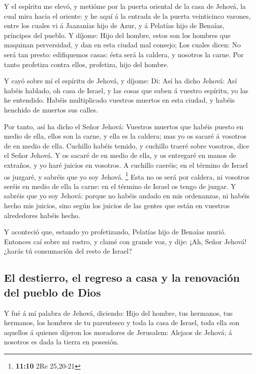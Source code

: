  Y el espíritu me elevó, y metióme por la puerta oriental de
la casa de Jehová, la cual mira hacia el oriente: y he aquí á la entrada
de la puerta veinticinco varones, entre los cuales vi á Jaazanías hijo
de Azur, y á Pelatías hijo de Benaías, príncipes del pueblo.
 Y díjome: Hijo del hombre, estos son los hombres que
maquinan perversidad, y dan en esta ciudad mal consejo;  Los
cuales dicen: No será tan presto: edifiquemos casas: ésta será la
caldera, y nosotros la carne.  Por tanto profetiza contra
ellos, profetiza, hijo del hombre.

 Y cayó sobre mí el espíritu de Jehová, y díjome: Di: Así ha
dicho Jehová: Así habéis hablado, oh casa de Israel, y las cosas que
suben á vuestro espíritu, yo las he entendido.  Habéis
multiplicado vuestros muertos en esta ciudad, y habéis henchido de
muertos sus calles.

 Por tanto, así ha dicho el Señor Jehová: Vuestros muertos
que habéis puesto en medio de ella, ellos son la carne, y ella es la
caldera; mas yo os sacaré á vosotros de en medio de ella. 
Cuchillo habéis temido, y cuchillo traeré sobre vosotros, dice el Señor
Jehová.  Y os sacaré de en medio de ella, y os entregaré en
manos de extraños, y yo haré juicios en vosotros.  A
cuchillo caeréis; en el término de Israel os juzgaré, y sabréis que yo
soy Jehová. \footnote{\textbf{11:10} 2Re 25,20-21}  Esta no
os será por caldera, ni vosotros seréis en medio de ella la carne: en el
término de Israel os tengo de juzgar.  Y sabréis que yo soy
Jehová: porque no habéis andado en mis ordenanzas, ni habéis hecho mis
juicios, sino según los juicios de las gentes que están en vuestros
alrededores habéis hecho.

 Y aconteció que, estando yo profetizando, Pelatías hijo de
Benaías murió. Entonces caí sobre mi rostro, y clamé con grande voz, y
dije: ¡Ah, Señor Jehová! ¿harás tú consumación del resto de Israel?

\hypertarget{el-destierro-el-regreso-a-casa-y-la-renovaciuxf3n-del-pueblo-de-dios}{%
\subsection{El destierro, el regreso a casa y la renovación del pueblo
de
Dios}\label{el-destierro-el-regreso-a-casa-y-la-renovaciuxf3n-del-pueblo-de-dios}}

 Y fué á mí palabra de Jehová, diciendo:  Hijo
del hombre, tus hermanos, tus hermanos, los hombres de tu parentesco y
toda la casa de Israel, toda ella son aquellos á quienes dijeron los
moradores de Jerusalem: Alejaos de Jehová; á nosotros es dada la tierra
en posesión.

